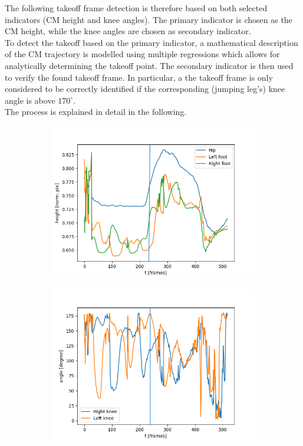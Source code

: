 The following takeoff frame detection is therefore based on both selected
indicators (\ac{CM} height and knee angles).
The primary indicator is chosen as the \ac{CM} height, while the knee angles
are chosen as secondary indicator.\\
To detect the takeoff based on the primary indicator, a mathematical
description of the \ac{CM} trajectory is modelled using multiple regressions
which allows for analytically determining the takeoff point.
The secondary indicator is then used to verify the found takeoff frame.
In particular, a the takeoff frame is only considered to be correctly
identified if the corresponding (jumping leg's) knee angle is above
$170^{\circ}$.\\
The process is explained in detail in the following.

\begin{figure}[h!]
    \begin{subfigure}[b]{0.5\textwidth}
        \includegraphics*[scale=0.45]{jump_runup_poor_start.png}
        \captionsetup{justification=centering, singlelinecheck=false, labelfont=bf}
        \label{subfig:runup_jump_landing_height}
    \end{subfigure}
    \begin{subfigure}[b]{0.5\textwidth}
        \includegraphics*[scale=0.45]{jump_runup_poor_start_angles.png}

\end{subfigure}
\end{figure}
